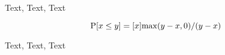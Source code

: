 \documentclass[12pt]{article}
\begin{document}
\begin{LRmath}

Text, Text, Text

\begin{equation}
    \mathrm{P}[x\le y] = [x]{\max(y-x,0)/(y-x)}
\end{equation}

Text, Text, Text

\end{LRmath}
\end{document}
